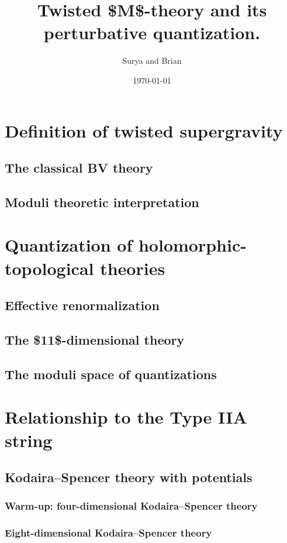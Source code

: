 \documentclass[11pt]{article}
\author{Surya and Brian}
\date{\today}
\title{Twisted \$M\$-theory and its perturbative quantization.}
\begin{document}
\maketitle
\tableofcontents


\section{Definition of twisted supergravity}
\label{sec:orgea6ebfa}
\subsection{The classical BV theory}
\label{sec:org23fe8d4}
\subsection{Moduli theoretic interpretation}
\label{sec:orgd709323}
\section{Quantization of holomorphic-topological theories}
\label{sec:orgec1821a}
\subsection{Effective renormalization}
\label{sec:org2b54a17}
\subsection{The \$11\$-dimensional theory}
\label{sec:org553e6b1}
\subsection{The moduli space of quantizations}
\label{sec:orgefb666b}
\section{Relationship to the Type IIA string}
\label{sec:org22f4829}
\subsection{Kodaira--Spencer theory with potentials}
\label{sec:org9f736c1}
\subsubsection{Warm-up: four-dimensional Kodaira--Spencer theory}
\label{sec:org0b90e8b}
\subsubsection{Eight-dimensional Kodaira--Spencer theory}
\label{sec:org3b2a900}
\end{document}
